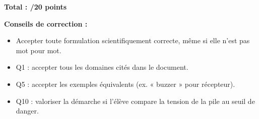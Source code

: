 \documentclass[11pt,a4paper]{article}
\begin{document}
\vspace{8mm}

\begin{center}
  \LARGE{\textbf{Total : /20 points}}
\end{center}

\vspace{5mm}

\begin{tcolorbox}[colback=red!5!white,colframe=red!75!black]
\textbf{Conseils de correction :}
\begin{itemize}
  \item Accepter toute formulation scientifiquement correcte, même si elle n'est pas mot pour mot.
  \item Q1 : accepter tous les domaines cités dans le document.
  \item Q5 : accepter les exemples équivalents (ex. « buzzer » pour récepteur).
  \item Q10 : valoriser la démarche si l'élève compare la tension de la pile au seuil de danger.
\end{itemize}
\end{tcolorbox}
\end{document}
